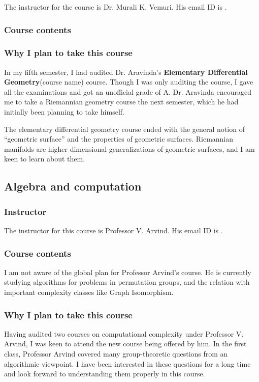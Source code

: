 \documentclass[a4paper]{amsart}
\newcommand{\coursename}[1]{{\bf #1}{\small{(course name)}}}
\begin{document}
The instructor for the course is Dr. Murali K. Vemuri. His email ID is
.

\subsubsection{Course contents}

\subsubsection{Why I plan to take this course}

In my fifth semester, I had audited Dr. Aravinda's
\coursename{Elementary Differential Geometry} course.  Though I was
only auditing the course, I gave all the examinations and got an
unofficial grade of A.  Dr. Aravinda encouraged me to take a
Riemannian geometry course the next semester, which he had initially
been planning to take himself.

The elementary differential geometry course ended with the general
notion of ``geometric surface'' and the properties of geometric
surfaces. Riemannian manifolds are higher-dimensional generalizations of geometric
surfaces, and I am keen to learn about them.

\subsection{Algebra and computation}

\subsubsection{Instructor}

The instructor for this course is Professor V. Arvind. His email ID is
. 

\subsubsection{Course contents}

I am not aware of the global plan for Professor Arvind's course. He is
currently studying algorithms for problems in permutation groups,
and the relation with important complexity classes like Graph Isomorphism.

\subsubsection{Why I plan to take this  course}

Having audited two courses on computational complexity under Professor
V. Arvind, I was keen to attend the new course being offered by him.
In the first class, Professor Arvind covered many group-theoretic
questions from an algorithmic viewpoint. I have been interested in
these questions for a long time and look forward to understanding them
properly in this course.



\printindex
\end{document}
